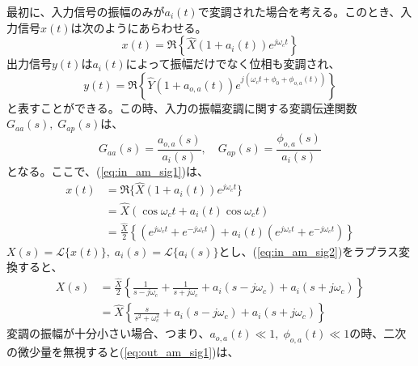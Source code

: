 \documentclass[book]{jlreq}
\begin{document}
最初に、入力信号の振幅のみが$a_i(t)$で変調された場合を考える。このとき、入力信号$x(t)$は次のようにあらわせる。
%
\begin{equation}
    x(t) = \Re\left \{\hat{X}(1 + a_i(t))e^{j\omega_c t}\right \}
    \label{eq:in_am_sig1}
\end{equation}
%
出力信号$y(t)$は$a_i(t)$によって振幅だけでなく位相も変調され、
%
\begin{equation}
    y(t) = \Re\left \{\hat{Y}(1 + a_{o,a}(t))e^{j(\omega_c t + \phi_0 + \phi_{o,a} (t))}\right \}
    \label{eq:out_am_sig1}
\end{equation}
%
と表すことができる。この時、入力の振幅変調に関する変調伝達関数$G_{aa}(s),\;G_{ap}(s)$は、
%
\begin{equation}
    G_{aa}(s) =  \frac{a_{o, a}(s)}{a_i(s)}, \quad G_{ap}(s) =  \frac{\phi_{o, a}(s)}{a_i(s)}
    \label{eq:am_tf}
\end{equation}
%
となる。ここで、(\ref{eq:in_am_sig1})は、
%
\begin{equation}
    \begin{split}
        x(t) &= \Re\{\hat{X}(1 + a_i(t))e^{j\omega_c t}\} \\
        &= \hat{X}(\cos\omega_c t + a_i(t) \cos\omega_c t) \\
        &=  \frac{\hat{X}}{2}\left \{(e^{j\omega_c t}+e^{-j\omega_c t})+a_i(t)(e^{j\omega_c t} + e^{-j\omega_c t}) \right \}
        \label{eq:in_am_sig2}
    \end{split}
\end{equation}
%
$X(s)=\mathcal{L}\{x(t)\},\; a_i(s) = \mathcal{L}\{a_i(s)\}$とし、(\ref{eq:in_am_sig2})をラプラス変換すると、
%
\begin{equation}
    \begin{split}
        X(s) &= \frac{\hat{X}}{2}\left \{\frac{1}{s-j\omega_c}
        + \frac{1}{s+j\omega_c} + a_i(s - j\omega_c)+a_i(s+j\omega_c) \right \} \\
        &= \hat{X}\left \{\frac{s}{s^2 + \omega_c^2}
        + a_i(s - j\omega_c)+a_i(s+j\omega_c) \right \}
    \end{split}
    \label{eq:lt_in_sig2}
\end{equation}
%
変調の振幅が十分小さい場合、つまり、$a_{o, a}(t) \ll 1,\; \phi_{o, a}(t) \ll 1$の時、二次の微少量を無視すると(\ref{eq:out_am_sig1})は、
%
\end{document}
